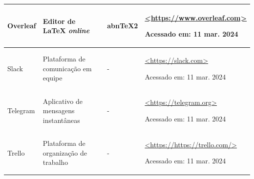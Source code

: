 \begin{quadro}
\begin{tabular}{|p{2.5cm}|p{5cm}|p{1.7cm}|p{6.4cm}|}
Overleaf               & Editor de LaTeX \textit{online} & abnTeX2                   & \href{https://www.overleaf.com}{<https://www.overleaf.com>} \par Acessado em: 11 mar. 2024 \\ \hline
Slack                  & Plataforma de comunicação em equipe & -                   & \href{https://slack.com}{<https://slack.com>} \par Acessado em: 11 mar. 2024 \\ \hline
Telegram               & Aplicativo de mensagens instantâneas & -                   & \href{https://telegram.org}{<https://telegram.org>} \par Acessado em: 11 mar. 2024 \\ \hline
Trello               & Plataforma de organização de trabalho & -                   & \href{https://https://trello.com/}{<https://https://trello.com/>} \par Acessado em: 11 mar. 2024 \\ \hline
\end{tabular}

\end{quadro} 